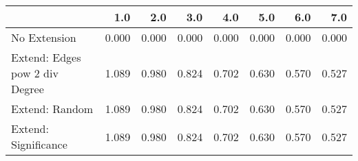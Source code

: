 \begin{tabular}{lrrrrrrr}
\toprule
{} &   1.0 &   2.0 &   3.0 &   4.0 &   5.0 &   6.0 &   7.0 \\
\midrule
No Extension                   & 0.000 & 0.000 & 0.000 & 0.000 & 0.000 & 0.000 & 0.000 \\
Extend: Edges pow 2 div Degree & 1.089 & 0.980 & 0.824 & 0.702 & 0.630 & 0.570 & 0.527 \\
Extend: Random                 & 1.089 & 0.980 & 0.824 & 0.702 & 0.630 & 0.570 & 0.527 \\
Extend: Significance           & 1.089 & 0.980 & 0.824 & 0.702 & 0.630 & 0.570 & 0.527 \\
\bottomrule
\end{tabular}
